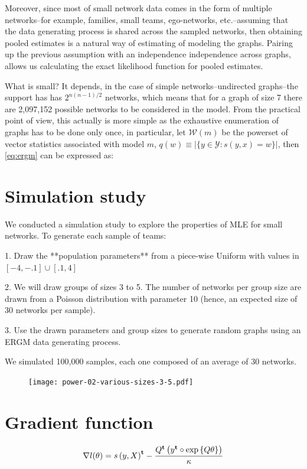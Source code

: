 \documentclass[12pt]{article}
\begin{document}
Moreover, since most of small network data comes in the form of multiple networks--for example, families, small teams, ego-networks, etc.--assuming that the data generating process is shared across the sampled networks, then obtaining pooled estimates is a natural way of estimating of modeling the graphs. Pairing up the previous assumption with an independence independence across graphs, allows us calculating the exact likelihood function for pooled estimates.







What is small? It depends, in the case of simple networks--undirected graphs--the support has has $2^{n(n-1)/2}$ networks, which means that for a graph of size 7 there are 2,097,152 possible networks to be considered in the model. From the practical point of view, this actually is more simple as the exhaustive enumeration of graphs has to be done only once, in particular, let $\mathcal{W}(m)$ be the powerset of vector statistics associated with model $m$, $q(w)\equiv |\{y\in\mathcal{Y}: s(y,x) = w\}|$, then \eqref{eq:ergm} can be expressed as:

\section{Simulation study}

We conducted a simulation study to explore the properties of MLE for small networks. To generate each sample of teams:

1. Draw the **population parameters** from a piece-wise Uniform with values in $[-4, -.1]\cup[.1, 4]$

2. We will draw groups of sizes 3 to 5. The number of networks per group size are drawn from a Poisson distribution with parameter 10 (hence, an expected size of 30 networks per sample).

3. Use the drawn parameters and group sizes to generate random graphs using an ERGM data generating process.

We simulated 100,000 samples, each one composed of an average of 30 networks.

\begin{figure}
	\centering
	\texttt{[image: power-02-various-sizes-3-5.pdf]}
\end{figure}





\appendix

\section{Gradient function}

\begin{equation}
\nabla l(\theta) = {s\left(y, X\right)}^\mathbf{t} - \frac{{Q}^\mathbf{t}\left({y}^\mathbf{t} \circ \mbox{exp}\left\{Q \theta\right\}\right)}{\kappa}
\end{equation}
\end{document}

